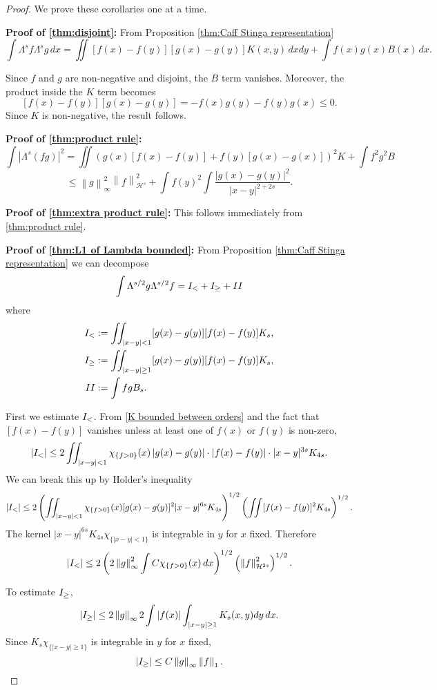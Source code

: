 \documentclass[11pt]{amsart}
\theoremstyle{remark}
\theoremstyle{definition}
\newcommand{\norm}[1]{\left\lVert#1\right\rVert}
\newcommand{\paren}[1]{\left( #1 \right)}
\newcommand{\abs}[1]{\left\lvert #1 \right\rvert}
\newcommand{\indic}[1]{\chi_{\{#1\}}}
\newcommand{\HD}{\mathcal{H}}
\newcommand{\Rom}[1]{\MakeUppercase{\romannumeral #1}}
\begin{document}
\begin{proof}
We prove these corollaries one at a time.  

\textbf{Proof of \eqref{thm:disjoint}:}
From Proposition \ref{thm:Caff Stinga representation}
\[ \int \Lambda^s f \Lambda^s g \,dx = \iint [f(x)-f(y)][g(x)-g(y)] K(x,y) \,dxdy + \int f(x) g(x) B(x) \,dx. \]

Since $f$ and $g$ are non-negative and disjoint, the $B$ term vanishes.  Moreover, the product inside the $K$ term becomes
\[ [f(x)-f(y)][g(x)-g(y)] = -f(x)g(y)-f(y)g(x) \leq 0. \]
Since $K$ is non-negative, the result follows.  

\textbf{Proof of \eqref{thm:product rule}:}
\[ \int |\Lambda^s (fg)|^2 = \iint \paren{g(x)[f(x)-f(y)] + f(y)[g(x)-g(x)]}^2 K + \int f^2 g^2 B \]
\[ \leq \norm{g}_\infty^2 \norm{f}_{\HD^s}^2 + \int f(y)^2 \int \frac{|g(x)-g(y)|^2}{|x-y|^{2+2s}}. \]

\textbf{Proof of \eqref{thm:extra product rule}:}
This follows immediately from \eqref{thm:product rule}.  

\textbf{Proof of \eqref{thm:L1 of Lambda bounded}:}
From Proposition \ref{thm:Caff Stinga representation} we can decompose
\[ \int \Lambda^{s/2} g \Lambda^{s/2} f = \Rom{1}_< + \Rom{1}_\geq + \Rom{2} \]
where
\begin{align*} 
\Rom{1}_< &:= \iint_{|x-y| < 1} [g(x)-g(y)][f(x)-f(y)] K_s, \\
\Rom{1}_\geq &:= \iint_{|x-y|\geq 1} [g(x)-g(y)][f(x)-f(y)] K_s, \\
\Rom{2} &:= \int f g B_s. 
\end{align*}

First we estimate $\Rom{1}_<$.  From \eqref{K bounded between orders} and the fact that $[f(x)-f(y)]$ vanishes unless at least one of $f(x)$ or $f(y)$ is non-zero,
\[ \abs{\Rom{1}_<} \leq 2 \iint_{|x-y| < 1} \indic{f > 0}(x) \abs{g(x)-g(y)} \cdot \abs{f(x)-f(y)} \cdot |x-y|^{3s} K_{4s}. \]
We can break this up by Holder's inequality
\[ \abs{\Rom{1}_<} \leq 2 \paren{\iint_{|x-y| < 1} \indic{f > 0}(x) [g(x)-g(y)]^2 |x-y|^{6s} K_{4s} }^{1/2} \paren{\iint [f(x)-f(y)]^2 K_{4s} }^{1/2}. \]
The kernel $|x-y|^{6s} K_{4s} \indic{|x-y| < 1}$ is integrable in $y$ for $x$ fixed.  Therefore
\begin{equation} \label{K near of L1 less than L2 stuff} \abs{\Rom{1}_<} \leq 2 \paren{ 2\norm{g}_\infty^2 \int C \indic{f > 0}(x) \,dx }^{1/2} \paren{ \norm{f}_{\HD^{2s}}^2}^{1/2}. \end{equation}

To estimate $\Rom{1}_\geq$,
\[ \abs{\Rom{1}_\geq} \leq  2\norm{g}_\infty 2\int |f(x)| \int_{|x-y|\geq 1} K_s(x,y)dy \,dx. \]
Since $K_s \indic{|x-y|\geq 1}$ is integrable in $y$ for $x$ fixed,
\begin{equation} \label{K far of L1 less than L2 stuff}
\abs{\Rom{1}_\geq} \leq C \norm{g}_\infty \norm{f}_1.  
\end{equation}


\end{proof}
\end{document}
